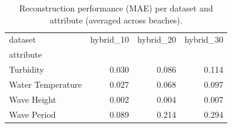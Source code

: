 \begin{table}
\caption{Reconstruction performance (MAE) per dataset and attribute (averaged across beaches).}
\label{tab:recon_mae_per_dataset_attribute}
\begin{tabular}{lrrr}
\toprule
dataset & hybrid_10 & hybrid_20 & hybrid_30 \\
attribute &  &  &  \\
\midrule
Turbidity & 0.030 & 0.086 & 0.114 \\
Water Temperature & 0.027 & 0.068 & 0.097 \\
Wave Height & 0.002 & 0.004 & 0.007 \\
Wave Period & 0.089 & 0.214 & 0.294 \\
\bottomrule
\end{tabular}
\end{table}
